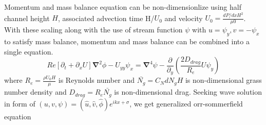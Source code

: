 \documentclass[aps,twocolumn,floatfix,prl,10pt]{revtex4-1}
\newcommand{\grad}{\mathbf{\nabla}}
\newcommand{\del}{\partial}
\begin{document}
Momentum and mass balance equation can be non-dimensionlize using half channel height $H$, associated advection time H/$U_0$ and velocity $U_0 = \frac{dP/dxH^2}{\mu0}$.
With these scaling along with the use of stream function $\psi$ with $u = \psi_{y}, v= -\psi_x$ to satisfy mass balance, momentum and mass balance can be combined 
into a single equation.
\begin{equation}
Re\left[\del_t+\del_x U \right]\grad^2\phi - U_{yy}\psi_x = \grad^4\psi-\frac{\del}{\del_y}\left(\frac{2D_{drag}}{R_e}U\psi_y\right)
\end{equation}
where $R_{e}= \frac{\rho U_0 H}{\mu}$ is Reynolds number and $\bar{N_g} = C_N d N_g H$ is non-dimensional grass number density and  $D_{drag} = R_{e}\bar{N_{g}}$ is 
non-dimensional drag. Seeking wave solution in form of $\left(u,v,\psi \right)= \left(\hat u, \hat v, \hat\phi \right)e^{ikx+\sigma}$, we get generalized orr-sommerfield equation 
\end{document}
